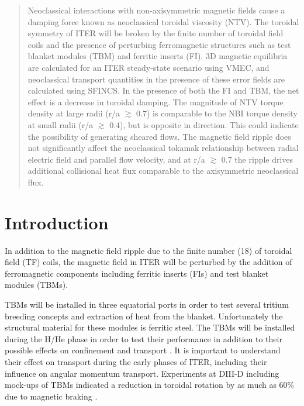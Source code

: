 \documentclass{article}
\begin{document}
\begin{abstract}

Neoclassical interactions with non-axisymmetric magnetic fields cause a damping force known as neoclassical toroidal viscosity (NTV). The toroidal symmetry of ITER will be broken by the finite number of toroidal field coils and the presence of perturbing ferromagnetic structures such as test blanket modules (TBM) and ferritic inserts (FI). 3D magnetic equilibria are calculated for an ITER steady-state scenario using VMEC, and neoclassical transport quantities in the presence of these error fields are calculated using SFINCS. In the presence of both the FI and TBM, the net effect is a decrease in toroidal damping. The magnitude of NTV torque density at large radii (r/a $\gtrsim$ 0.7) is comparable to the NBI torque density at small radii (r/a $\gtrsim$ 0.4), but is opposite in direction. This could indicate the possibility of generating sheared flows. The magnetic field ripple does not significantly affect the neoclassical tokamak relationship between radial electric field and parallel flow velocity, and at r/a $\gtrsim$ 0.7 the ripple drives additional collisional heat flux comparable to the axisymmetric neoclassical flux.

\end{abstract}

\section{Introduction}

In addition to the magnetic field ripple due to the finite number (18) of toroidal field (TF) coils, the magnetic field in ITER will be perturbed by the addition of ferromagnetic components including ferritic inserts (FIs) and test blanket modules (TBMs). 

TBMs will be installed in three equatorial ports in order to test several tritium breeding concepts and extraction of heat from the blanket. Unfortunately the structural material for these modules is ferritic steel. The TBMs will be installed during the H/He phase in order to test their performance in addition to their possible effects on confinement and transport \cite{Chuyanov2010}. It is important to understand their effect on transport during the early phases of ITER, including their influence on angular momentum transport. Experiments at DIII-D including mock-ups of TBMs indicated a reduction in toroidal rotation by as much as 60\% due to magnetic braking \cite{Schaffer2011}. 
\end{document}
